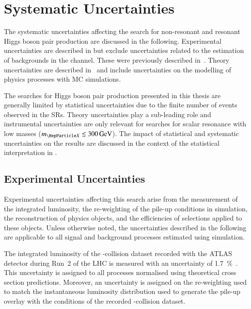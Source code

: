 \section{Systematic Uncertainties}%
\label{sec:uncertainties}

The systematic uncertainties affecting the search for non-resonant and resonant
Higgs boson pair production are discussed in the following. Experimental
uncertainties are described in  but exclude
uncertainties related to the estimation of \faketauhadvis backgrounds in the
\hadhad channel. These were previously described
in~. Theory uncertainties are
described in~ and include uncertainties on the
modelling of physics processes with MC simulations.

The searches for Higgs boson pair production presented in this thesis are
generally limited by statistical uncertainties due to the finite number of
events observed in the SRs. Theory uncertainties play a sub-leading role and
instrumental uncertainties are only relevant for searches for scalar resonance
with low masses ($\mX \lesssim \SI{300}{\GeV}$). The impact of statistical and
systematic uncertainties on the results are discussed in the context of the
statistical interpretation in .


\subsection{Experimental Uncertainties}%
\label{sec:experimental_uncertainties}

Experimental uncertainties affecting this search arise from the measurement of
the integrated luminosity, the re-weighting of the pile-up conditions in
simulation, the reconstruction of physics objects, and the efficiencies of
selections applied to these objects. Unless otherwise noted, the uncertainties
described in the following are applicable to all signal and background processes
estimated using simulation.

The integrated luminosity of the \pp-collision dataset recorded with the ATLAS
detector during Run~2 of the LHC is measured with an uncertainty of
\SI{1.7}{\percent}~\cite{ATLAS-CONF-2019-021}. This uncertainty is assigned to
all processes normalised using theoretical cross section predictions. Moreover,
an uncertainty is assigned on the re-weighting used to match the instantaneous
luminosity distribution used to generate the pile-up overlay with the conditions
of the recorded \pp-collision dataset.


